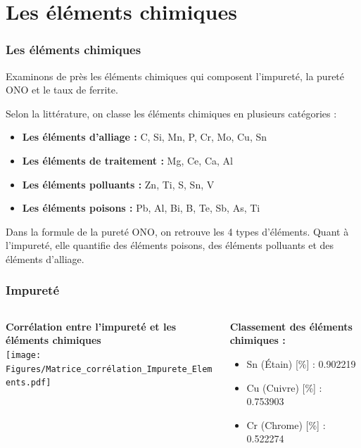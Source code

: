 \documentclass[aspectratio=169]{beamer}
\begin{document}
\section{Les éléments chimiques}



\begin{frame}
\frametitle{Les éléments chimiques}
Examinons de près les éléments chimiques qui composent l'impureté, la pureté ONO et le taux de ferrite.

Selon la littérature, on classe les éléments chimiques en plusieurs catégories :

\begin{itemize}
    \item \textbf{Les éléments d'alliage :}  C, Si, Mn, P, Cr, Mo, Cu, Sn 
    \item \textbf{Les éléments de traitement :} Mg, Ce, Ca, Al
    \item \textbf{Les éléments polluants :}  Zn, Ti, S, Sn, V 
    \item \textbf{Les éléments poisons :}  Pb, Al, Bi, B, Te, Sb, As, Ti
\end{itemize}
\vspace{5pt}
Dans la formule de la pureté ONO, on retrouve les 4 types d'éléments.
Quant à l'impureté, elle quantifie des éléments poisons, des éléments polluants et des éléments d'alliage.

\end{frame}


\begin{frame}
\frametitle{Impureté}
\begin{columns}[t]
  \begin{column}{0.5\textwidth}
    \centering
    \textbf{Corrélation entre l'impureté et les éléments chimiques} \\
    \texttt{[image: Figures/Matrice\_corrélation\_Impurete\_Elements.pdf]} 
  \end{column}
  \begin{column}{0.5\textwidth}
     \textbf{Classement des éléments chimiques :}
    \begin{itemize}
      \item Sn (Étain) [\%] : 0.902219
      \item Cu (Cuivre) [\%] : 0.753903
      \item Cr (Chrome) [\%] : 0.522274
    \end{itemize}
  \end{column}
\end{columns}
\end{frame}
\end{document}
